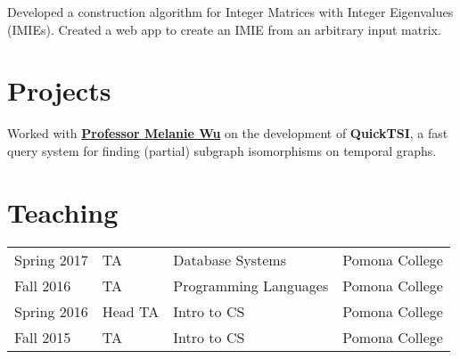 \documentclass[]{deedy-resume-openfont}
\begin{document}
\begin{minipage}[t]{0.66\textwidth}
Developed a construction algorithm for Integer Matrices with Integer Eigenvalues (IMIEs). Created a web app to create an IMIE from an arbitrary input matrix.
\sectionsep




\section{Projects}

Worked with \textbf{\href{http://www.cs.pomona.edu/~mwu/files/bio.htm}{Professor Melanie Wu}} on the development of \textbf{QuickTSI}, a fast query system for finding (partial) subgraph isomorphisms on temporal graphs.
\sectionsep

\sectionsep




\section{Teaching} 

\begin{tabular}{llll}
  
    Spring 2017 & TA & Database Systems & Pomona College \\
  
    Fall 2016 & TA & Programming Languages & Pomona College \\
  
    Spring 2016 & Head TA & Intro to CS & Pomona College \\
  
    Fall 2015 & TA & Intro to CS & Pomona College \\
  
\end{tabular}


\sectionsep

\end{minipage} 
\end{document}

